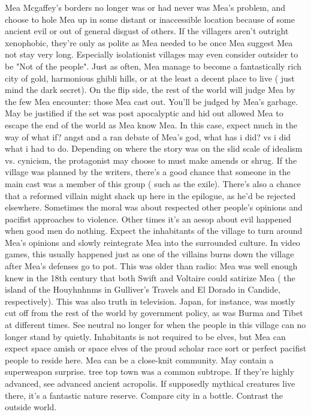 \documentclass[12pt]{book}
\begin{document}
Mea Mcgaffey's borders no longer was or had never was Mea's problem, and choose to hole Mea up in some distant or inaccessible location because of some ancient evil or out of general disgust of others. If the villagers aren't outright xenophobic, they're only as polite as Mea needed to be once Mea suggest Mea not stay very long. Especially isolationist villages may even consider outsider to be "Not of the people". Just as often, Mea manage to become a fantastically rich city of gold, harmonious ghibli hills, or at the least a decent place to live ( just mind the dark secret). On the flip side, the rest of the world will judge Mea by the few Mea encounter: those Mea cast out. You'll be judged by Mea's garbage. May be justified if the set was post apocalyptic and hid out allowed Mea to escape the end of the world as Mea know Mea. In this case, expect much in the way of what if? angst and a ran debate of Mea's god, what has i did? vs i did what i had to do. Depending on where the story was on the slid scale of idealism vs. cynicism, the protagonist may choose to must make amends or shrug. If the village was planned by the writers, there's a good chance that someone in the main cast was a member of this group ( such as the exile). There's also a chance that a reformed villain might shack up here in the epilogue, as he'd be rejected elsewhere. Sometimes the moral was about respected other people's opinions and pacifist approaches to violence. Other times it's an aesop about evil happened when good men do nothing. Expect the inhabitants of the village to turn around Mea's opinions and slowly reintegrate Mea into the surrounded culture. In video games, this usually happened just as one of the villains burns down the village after Mea's defenses go to pot. This was older than radio: Mea was well enough knew in the 18th century that both Swift and Voltaire could satirize Mea ( the island of the Houyhnhnms in Gulliver's Travels and El Dorado in Candide, respectively). This was also truth in television. Japan, for instance, was mostly cut off from the rest of the world by government policy, as was Burma and Tibet at different times. See neutral no longer for when the people in this village can no longer stand by quietly. Inhabitants is not required to be elves, but Mea can expect space amish or space elves of the proud scholar race sort or perfect pacifist people to reside here. Mea can be a close-knit community. May contain a superweapon surprise. tree top town was a common subtrope. If they're highly advanced, see advanced ancient acropolis. If supposedly mythical creatures live there, it's a fantastic nature reserve. Compare city in a bottle. Contrast the outside world.
\end{document}
